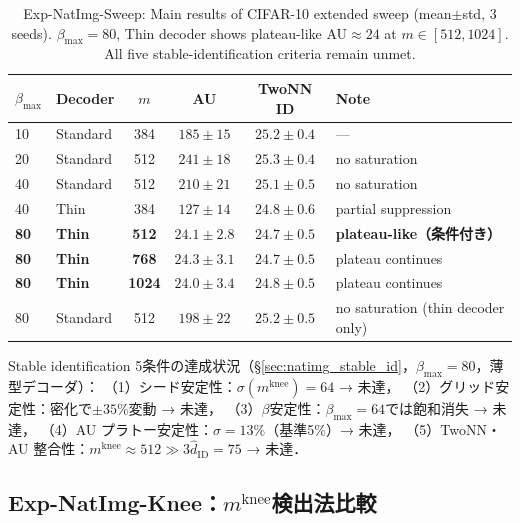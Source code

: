 \documentclass[11pt,a4paper]{jsarticle}
\newcommand{\mknee}{m^{\mathrm{knee}}}
\begin{document}
\begin{table}[H]
\centering
\caption{Exp-NatImg-Sweep: Main results of CIFAR-10 extended sweep (mean$\pm$std, 3 seeds). $\beta_\mathrm{max}=80$, Thin decoder shows plateau-like AU$\approx24$ at $m \in [512,1024]$. All five stable-identification criteria remain unmet.}
\label{tab:natimg_sweep}
\small
\begin{tabular}{llcccl}
\toprule
$\beta_{\max}$ & Decoder & $m$ & AU & TwoNN ID & Note \\
\midrule
10 & Standard & 384 & $185\pm15$ & $25.2\pm0.4$ & --- \\
20 & Standard & 512 & $241\pm18$ & $25.3\pm0.4$ & no saturation \\
40 & Standard & 512 & $210\pm21$ & $25.1\pm0.5$ & no saturation \\
40 & Thin      & 384 & $127\pm14$ & $24.8\pm0.6$ & partial suppression \\
\textbf{80} & \textbf{Thin} & \textbf{512} & $\boldsymbol{24.1\pm2.8}$ & $24.7\pm0.5$ & \textbf{plateau-like（条件付き）} \\
\textbf{80} & \textbf{Thin} & \textbf{768} & $\boldsymbol{24.3\pm3.1}$ & $24.7\pm0.5$ & plateau continues \\
\textbf{80} & \textbf{Thin} & \textbf{1024}& $\boldsymbol{24.0\pm3.4}$ & $24.8\pm0.5$ & plateau continues \\
80 & Standard  & 512 & $198\pm22$ & $25.2\pm0.5$ & no saturation (thin decoder only) \\
\bottomrule
\end{tabular}
\end{table}

Stable identification 5条件の達成状況（§\ref{sec:natimg_stable_id}，$\beta_{\max}=80$，薄型デコーダ）：
（1）シード安定性：$\sigma(\mknee)=64$ → 未達，
（2）グリッド安定性：密化で$\pm35\%$変動 → 未達，
（3）$\beta$安定性：$\beta_{\max}=64$では飽和消失 → 未達，
（4）AU プラトー安定性：$\sigma=13\%$（基準5\%）→ 未達，
（5）TwoNN・AU 整合性：$\mknee \approx 512 \gg 3\hat{d}_\mathrm{ID}=75$ → 未達．

\subsection*{Exp-NatImg-Knee：$\mknee$検出法比較}
\end{document}
